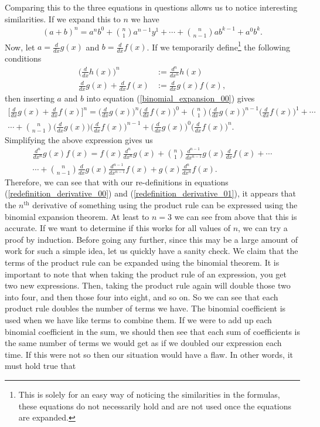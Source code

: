 Comparing this to the three equations in questions allows us to notice interesting similarities. If we expand this to $n$ we have
\begin{align}
	(a+b)^n=a^nb^0+{{n}\choose{1}}a^{n-1}y^1+\cdots+{{n}\choose{n-1}}ab^{k-1}+a^0b^k. \label{binomial_expansion_00}
\end{align}
Now, let $a=\frac{d}{dx}g(x)$ and $b=\frac{d}{dx}f(x)$. If we temporarily define\footnote{This is solely for an easy way of noticing the similarities in the formulas, these equations do not necessarily hold and are not used once the equations are expanded.} the following conditions
\begin{align}
	\bigg(\frac{d}{dx}h(x)\bigg)^n&:=\frac{d^n}{dx^n}h(x) \label{redefinition_derivative_00}\\
	\frac{d}{dx}g(x)+\frac{d}{dx}f(x) &:= \frac{d}{dx}g(x)f(x) \label{redefinition_derivative_01},
\end{align}
then inserting $a$ and $b$ into equation (\ref{binomial_expansion_00}) gives
\begin{align}
	\bigg[\frac{d}{dx}g(x)+\frac{d}{dx}f(x) \bigg]^n=\bigg(\frac{d}{dx}g(x)\bigg)^n\bigg(\frac{d}{dx}f(x)\bigg)^0+{{n}\choose{1}}\bigg(\frac{d}{dx}g(x)\bigg)^{n-1}\bigg(\frac{d}{dx}f(x)\bigg)^1+\cdots \\ \cdots+{{n}\choose{n-1}}\bigg(\frac{d}{dx}g(x)\bigg)\bigg(\frac{d}{dx}f(x)\bigg)^{n-1}+\bigg(\frac{d}{dx}g(x)\bigg)^0\bigg(\frac{d}{dx}f(x)\bigg)^n.
\end{align}
Simplifying the above expression gives us
\begin{align}
	\frac{d^n}{dx^n}g(x)f(x)=f(x)\frac{d^n}{dx^n}g(x)+{{n}\choose{1}}\frac{d^{n-1}}{dx^{n-1}}g(x)\frac{d}{dx}f(x)+\cdots \\
	\cdots+{{n}\choose{n-1}}\frac{d}{dx}g(x)\frac{d^{n-1}}{dx^{n-1}}f(x)+g(x)\frac{d^n}{dx^n}f(x).
\end{align}
Therefore, we can see that with our re-definitions in equations (\ref{redefinition_derivative_00}) and (\ref{redefinition_derivative_01}), it appears that the $n^{\textrm{th}}$ derivative of something using the product rule can be expressed using the binomial expansion theorem. At least to $n=3$ we can see from above that this is accurate. If we want to determine if this works for all values of $n$, we can try a proof by induction. Before going any further, since this may be a large amount of work for such a simple idea, let us quickly have a sanity check. We claim that the terms of the product rule can be expanded using the binomial theorem. It is important to note that when taking the product rule of an expression, you get two new expressions. Then, taking the product rule again will double those two into four, and then those four into eight, and so on. So we can see that each product rule doubles the number of terms we have. The binomial coefficient is used when we have like terms to combine them. If we were to add up each binomial coefficient in the sum, we should then see that each sum of coefficients is the same number of terms we would get as if we doubled our expression each time. If this were not so then our situation would have a flaw. In other words, it must hold true that
